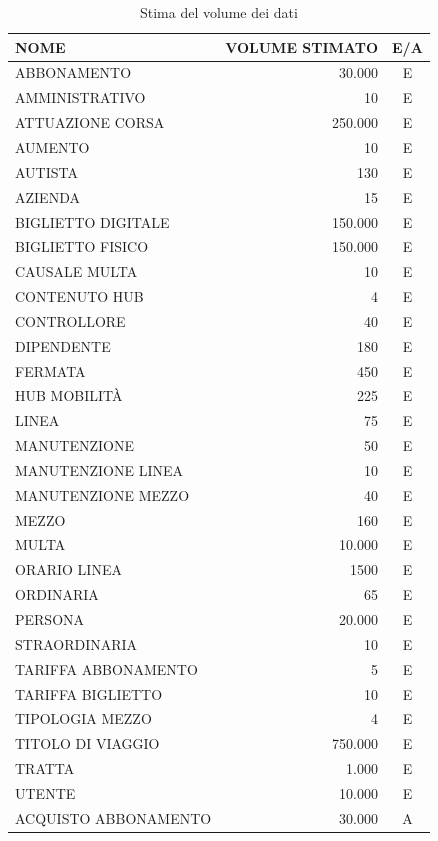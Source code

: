 \documentclass[12pt,a4paper]{report}
\begin{document}
\begin{longtable}{|p{7.5cm}|r|c|}
\caption{Stima del volume dei dati}
\label{table:volumeDati}\\
\hline
\textbf{NOME} & \textbf{VOLUME STIMATO} & \textbf{E/A} \\
\hline
\endhead

ABBONAMENTO & 30.000 & E \\
\hline
AMMINISTRATIVO & 10 & E \\
\hline
ATTUAZIONE CORSA & 250.000 & E \\
\hline
AUMENTO & 10 & E \\
\hline
AUTISTA & 130 & E \\
\hline
AZIENDA & 15 & E\\
\hline
BIGLIETTO DIGITALE & 150.000 & E \\
\hline
BIGLIETTO FISICO & 150.000 & E \\
\hline
CAUSALE MULTA & 10 & E \\
\hline
CONTENUTO HUB & 4 & E \\
\hline
CONTROLLORE & 40 & E \\
\hline
DIPENDENTE & 180 & E \\
\hline
FERMATA & 450 & E \\
\hline
HUB MOBILITÀ & 225 & E \\
\hline
LINEA & 75 & E \\
\hline
MANUTENZIONE & 50 & E \\
\hline
MANUTENZIONE LINEA & 10 & E \\
\hline
MANUTENZIONE MEZZO & 40 & E \\
\hline
MEZZO & 160 & E \\
\hline
MULTA & 10.000 & E \\
\hline
ORARIO LINEA & 1500 & E \\
\hline
ORDINARIA & 65 & E \\
\hline
PERSONA & 20.000 & E \\
\hline
STRAORDINARIA & 10 & E \\
\hline
TARIFFA ABBONAMENTO & 5 & E \\
\hline
TARIFFA BIGLIETTO & 10 & E \\
\hline
TIPOLOGIA MEZZO & 4 & E \\
\hline
TITOLO DI VIAGGIO & 750.000 & E \\
\hline
TRATTA & 1.000 & E \\
\hline
UTENTE & 10.000 & E \\
\hline
ACQUISTO ABBONAMENTO & 30.000 & A \\

\end{longtable}
\end{document}
